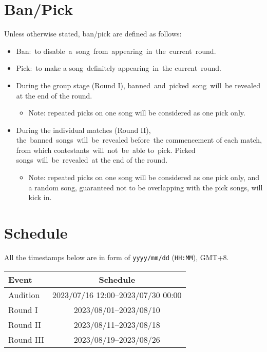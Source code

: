 \documentclass{article}
\newcommand{\alert}[1]{{\color{red} #1}}
\begin{document}
\section{Ban/Pick}
Unless otherwise stated, ban/pick are defined as follows:
\begin{itemize}
	\item Ban: to disable a song from appearing in the current round.

	\item Pick: to make a song definitely appearing in the current round.

	\item During the group stage (Round I),
	      banned and picked song will be revealed
	      at the end of the round.
	      \begin{itemize}
		      \item \alert{
			            Note: repeated picks on one
			            song will be considered as one pick only.
		            }
	      \end{itemize}

	\item During the individual matches (Round II),
	      the banned songs will be revealed before the commencement of each match,
	      from which contestants will not be able to pick.
	      Picked songs will be revealed at the end of the round.
	      \begin{itemize}
		      \item \alert{
			            Note: repeated picks on one
			            song will be considered as one pick only,
			            and a random song,
			            guaranteed not to be
			            overlapping with the pick songs,
			            will kick in.  %
		            }
	      \end{itemize}
\end{itemize}

\section{Schedule}

All the timestamps below are in form of
\texttt{yyyy/mm/dd} (\texttt{HH:MM}), GMT+8.

\begin{table}[!ht]
	\centering
	\begin{tabular}{lc}
		\hline
		Event     & Schedule                           \\ \hline
		Audition  & 2023/07/16 12:00--2023/07/30 00:00 \\
		Round I   & 2023/08/01--2023/08/10             \\
		Round II  & 2023/08/11--2023/08/18             \\
		Round III & 2023/08/19--2023/08/26             \\ \hline
	\end{tabular}
\end{table}
\end{document}
